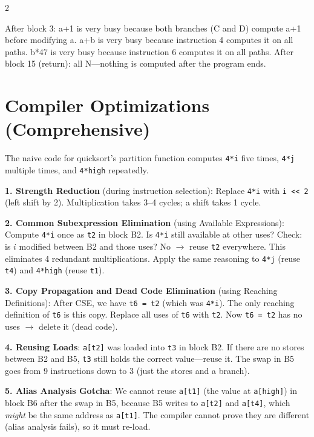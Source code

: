 \documentclass[9pt,landscape]{extarticle}
\begin{document}
\begin{multicols}{2}
\begin{exambox}
After block 3: a+1 is very busy because both branches (C and D) compute a+1 before modifying a. a+b is very busy because instruction 4 computes it on all paths. b*47 is very busy because instruction 6 computes it on all paths. After block 15 (return): all N---nothing is computed after the program ends.
\end{exambox}

\section{Compiler Optimizations (Comprehensive)}

\begin{exambox}
The naive code for quicksort's partition function computes \texttt{4*i} five times, \texttt{4*j} multiple times, and \texttt{4*high} repeatedly.

\textbf{1. Strength Reduction} (during instruction selection): Replace \texttt{4*i} with \texttt{i << 2} (left shift by 2). Multiplication takes 3--4 cycles; a shift takes 1 cycle.

\textbf{2. Common Subexpression Elimination} (using Available Expressions): Compute \texttt{4*i} once as \texttt{t2} in block B2. Is \texttt{4*i} still available at other uses? Check: is $i$ modified between B2 and those uses? No $\to$ reuse \texttt{t2} everywhere. This eliminates 4 redundant multiplications. Apply the same reasoning to \texttt{4*j} (reuse \texttt{t4}) and \texttt{4*high} (reuse \texttt{t1}).

\textbf{3. Copy Propagation and Dead Code Elimination} (using Reaching Definitions): After CSE, we have \texttt{t6 = t2} (which was \texttt{4*i}). The only reaching definition of \texttt{t6} is this copy. Replace all uses of \texttt{t6} with \texttt{t2}. Now \texttt{t6 = t2} has no uses $\to$ delete it (dead code).

\textbf{4. Reusing Loads}: \texttt{a[t2]} was loaded into \texttt{t3} in block B2. If there are no stores between B2 and B5, \texttt{t3} still holds the correct value---reuse it. The swap in B5 goes from 9 instructions down to 3 (just the stores and a branch).

\textbf{5. Alias Analysis Gotcha}: We cannot reuse \texttt{a[t1]} (the value at \texttt{a[high]}) in block B6 after the swap in B5, because B5 writes to \texttt{a[t2]} and \texttt{a[t4]}, which \emph{might} be the same address as \texttt{a[t1]}. The compiler cannot prove they are different (alias analysis fails), so it must re-load.


\end{exambox}
\end{multicols}
\end{document}
